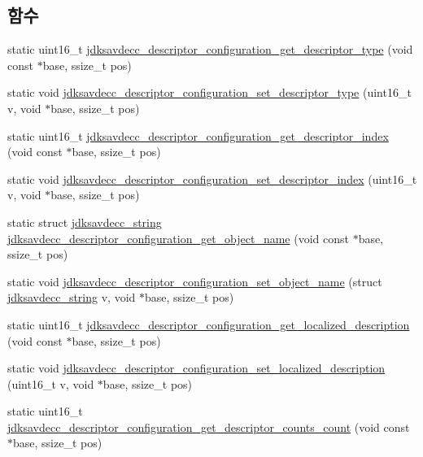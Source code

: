 \subsection*{함수}
\begin{DoxyCompactItemize}
\item 
static uint16\+\_\+t \hyperlink{group__descriptor__configuration_ga6d8fc7c6f91ce938afbebc9681561e7f}{jdksavdecc\+\_\+descriptor\+\_\+configuration\+\_\+get\+\_\+descriptor\+\_\+type} (void const $\ast$base, ssize\+\_\+t pos)
\item 
static void \hyperlink{group__descriptor__configuration_gaa6ec231100cf99ad1d5ed13f18fa6796}{jdksavdecc\+\_\+descriptor\+\_\+configuration\+\_\+set\+\_\+descriptor\+\_\+type} (uint16\+\_\+t v, void $\ast$base, ssize\+\_\+t pos)
\item 
static uint16\+\_\+t \hyperlink{group__descriptor__configuration_ga25a1868246dd5a8f9e0a6c0dd6e40526}{jdksavdecc\+\_\+descriptor\+\_\+configuration\+\_\+get\+\_\+descriptor\+\_\+index} (void const $\ast$base, ssize\+\_\+t pos)
\item 
static void \hyperlink{group__descriptor__configuration_gaa70e9bd8e84cc7e6a9d1fc70b34e953a}{jdksavdecc\+\_\+descriptor\+\_\+configuration\+\_\+set\+\_\+descriptor\+\_\+index} (uint16\+\_\+t v, void $\ast$base, ssize\+\_\+t pos)
\item 
static struct \hyperlink{structjdksavdecc__string}{jdksavdecc\+\_\+string} \hyperlink{group__descriptor__configuration_gab176c933b7ba3d33bb57e1769e1df4c6}{jdksavdecc\+\_\+descriptor\+\_\+configuration\+\_\+get\+\_\+object\+\_\+name} (void const $\ast$base, ssize\+\_\+t pos)
\item 
static void \hyperlink{group__descriptor__configuration_ga3e4d1b14aa53cfddc40de732b4974e4f}{jdksavdecc\+\_\+descriptor\+\_\+configuration\+\_\+set\+\_\+object\+\_\+name} (struct \hyperlink{structjdksavdecc__string}{jdksavdecc\+\_\+string} v, void $\ast$base, ssize\+\_\+t pos)
\item 
static uint16\+\_\+t \hyperlink{group__descriptor__configuration_ga70dadf1368b9c22e913d1b9068a23984}{jdksavdecc\+\_\+descriptor\+\_\+configuration\+\_\+get\+\_\+localized\+\_\+description} (void const $\ast$base, ssize\+\_\+t pos)
\item 
static void \hyperlink{group__descriptor__configuration_ga2787526a8563ed9d37aff47b667a9a4c}{jdksavdecc\+\_\+descriptor\+\_\+configuration\+\_\+set\+\_\+localized\+\_\+description} (uint16\+\_\+t v, void $\ast$base, ssize\+\_\+t pos)
\item 
static uint16\+\_\+t \hyperlink{group__descriptor__configuration_gad6922158e53499489216fe5842103f98}{jdksavdecc\+\_\+descriptor\+\_\+configuration\+\_\+get\+\_\+descriptor\+\_\+counts\+\_\+count} (void const $\ast$base, ssize\+\_\+t pos)

\end{DoxyCompactItemize}

